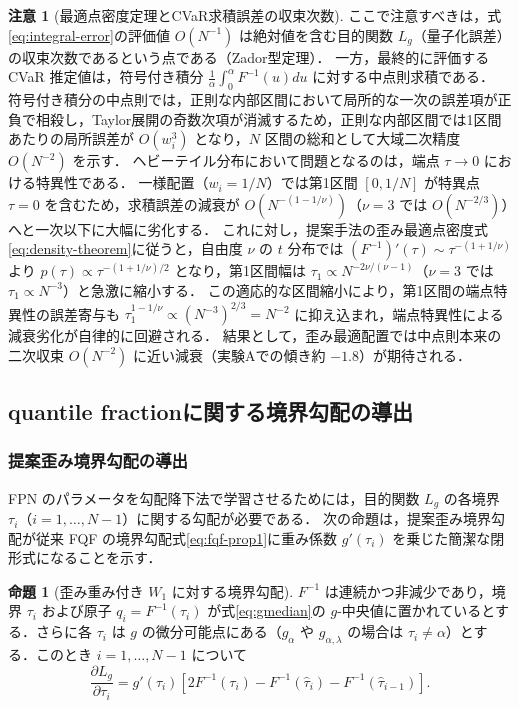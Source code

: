 \documentclass[a4paper,10pt]{jsarticle}
\theoremstyle{definition}
\newtheorem{proposition}{命題}[section]
\newtheorem{remark}{注意}[section]
\newcommand{\Wone}{W_1}
\renewcommand{\Finv}{F^{-1}}
\begin{document}
\begin{remark}[最適点密度定理とCVaR求積誤差の収束次数]
ここで注意すべきは，式\eqref{eq:integral-error}の評価値 $O(N^{-1})$ は絶対値を含む目的関数 $L_g$（量子化誤差）の収束次数であるという点である（Zador型定理）．
一方，最終的に評価する CVaR 推定値は，符号付き積分 $\frac{1}{\alpha}\int_0^\alpha \Finv(u)du$ に対する中点則求積である．
符号付き積分の中点則では，正則な内部区間において局所的な一次の誤差項が正負で相殺し，Taylor展開の奇数次項が消滅するため，正則な内部区間では1区間あたりの局所誤差が $O(w_i^3)$ となり，$N$ 区間の総和として大域二次精度 $O(N^{-2})$ を示す．
ヘビーテイル分布において問題となるのは，端点 $\tau \to 0$ における特異性である．
一様配置（$w_i = 1/N$）では第1区間 $[0, 1/N]$ が特異点 $\tau=0$ を含むため，求積誤差の減衰が $O(N^{-(1-1/\nu)})$（$\nu=3$ では $O(N^{-2/3})$）へと一次以下に大幅に劣化する．
これに対し，提案手法の歪み最適点密度式\eqref{eq:density-theorem}に従うと，自由度 $\nu$ の $t$ 分布では $(\Finv)'(\tau) \sim \tau^{-(1+1/\nu)}$ より $p(\tau) \propto \tau^{-(1+1/\nu)/2}$ となり，第1区間幅は $\tau_1 \propto N^{-2\nu/(\nu-1)}$（$\nu=3$ では $\tau_1 \propto N^{-3}$）と急激に縮小する．
この適応的な区間縮小により，第1区間の端点特異性の誤差寄与も $\tau_1^{1-1/\nu} \propto (N^{-3})^{2/3} = N^{-2}$ に抑え込まれ，端点特異性による減衰劣化が自律的に回避される．
結果として，歪み最適配置では中点則本来の二次収束 $O(N^{-2})$ に近い減衰（実験Aでの傾き約 $-1.8$）が期待される．
\end{remark}

\subsection{quantile fractionに関する境界勾配の導出}
\label{subsec:dist-grad}

\subsubsection{提案歪み境界勾配の導出}
FPN のパラメータを勾配降下法で学習させるためには，目的関数 $L_g$ の各境界 $\tau_i$（$i=1,\dots,N-1$）に関する勾配が必要である．
次の命題は，提案歪み境界勾配が従来 FQF の境界勾配式\eqref{eq:fqf-prop1}に重み係数 $g'(\tau_i)$ を乗じた簡潔な閉形式になることを示す．

\begin{proposition}[歪み重み付き $\Wone$ に対する境界勾配]
\label{prop:grad}
$\Finv$ は連続かつ非減少であり，境界 $\tau_i$ および原子 $q_i = \Finv(\hat\tau_i)$ が式\eqref{eq:gmedian}の $g$-中央値に置かれているとする．さらに各 $\tau_i$ は $g$ の微分可能点にある（$g_\alpha$ や $g_{\alpha,\lambda}$ の場合は $\tau_i \ne \alpha$）とする．このとき $i=1,\dots,N-1$ について
\begin{equation}
  \frac{\partial L_g}{\partial\tau_i} = g'(\tau_i)\left[2\Finv(\tau_i) - \Finv(\hat\tau_i) - \Finv(\hat\tau_{i-1})\right].
  \label{eq:dist-grad}
\end{equation}
\end{proposition}
\end{document}
